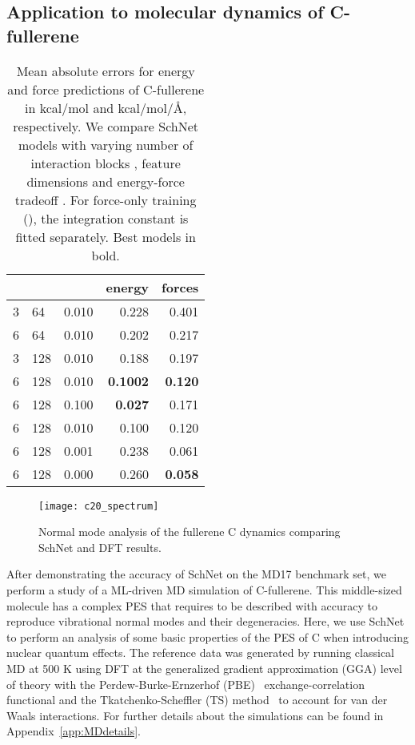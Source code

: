 \documentclass[aip,jcp,reprint,graphicx]{revtex4-1}
\newcommand{\new}[1]{#1}
\begin{document}
\subsection{Application to molecular dynamics of C-fullerene}\label{sec:c20}

\begin{table}
	\caption{\label{tab:c20models} Mean absolute errors for energy and force predictions of C-fullerene in kcal/mol and kcal/mol/\AA, respectively. We compare SchNet models with varying number of interaction blocks , feature dimensions  and energy-force tradeoff . For force-only training (), the integration constant is fitted separately. Best models in bold.}
	\begin{ruledtabular}
		\begin{tabular}{lllrr}
			 &  &  &          energy &          forces \\ \hline
			3   & 64  & 0.010  &          0.228 &          0.401 \\
			6   & 64  & 0.010  &          0.202 &          0.217 \\
			3   & 128 & 0.010  &          0.188 &          0.197 \\
			6   & 128 & 0.010  &          \textbf{0.1002} &         \textbf{ 0.120} \\ \hline
			6   & 128 & 0.100  & \textbf{0.027} &          0.171 \\
			6   & 128 & 0.010  &          0.100 &          0.120 \\
			6   & 128 & 0.001  &          0.238 &          0.061 \\
			6   & 128 & 0.000  &          0.260 & \textbf{0.058}
		\end{tabular}
	\end{ruledtabular}
\end{table}

\begin{figure}
	\texttt{[image: c20\_spectrum]}
	\caption{Normal mode analysis of the fullerene C dynamics comparing SchNet and DFT results.	\label{fig:c20mda}}
\end{figure}
After demonstrating the accuracy of SchNet on the MD17 benchmark set, we perform a study of a ML-driven MD simulation of C-fullerene. 
This middle-sized molecule has a complex PES that requires to be described with accuracy to reproduce vibrational normal modes and their degeneracies. 
Here, we use SchNet to perform an analysis of some basic properties of the PES of C when introducing nuclear quantum effects.
\new{The reference data was generated by running classical MD at 500 K using DFT at the generalized gradient approximation (GGA) level of theory with the Perdew-Burke-Ernzerhof (PBE)~\citep{PBE1996} exchange-correlation functional and the Tkatchenko-Scheffler (TS) method~\citep{TS2009} to account for van der Waals interactions. For further details about the simulations can be found in Appendix~\ref{app:MDdetails}.}
\end{document}
